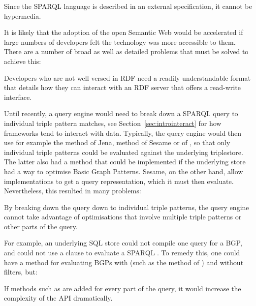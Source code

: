 \begin{problem}\label{prob:tpf}
Since the SPARQL language is described in an external specification,
it cannot be hypermedia.
\end{problem}

It is likely that the adoption of the open Semantic Web would be
accelerated if large numbers of developers felt the technology was
more accessible to them. There are a number of broad as well as
detailed problems that must be solved to achieve this:


\begin{problem}\label{prob:lapis}
Developers who are not well versed in RDF need a readily
understandable format that details how they can interact with an RDF
server that offers a read-write interface.
\end{problem}


Until recently, a query engine would need to break down a SPARQL query
to individual triple pattern matches, see
Section~\ref{sec:introinteract} for how frameworks tend to interact
with data. Typically, the query engine would then use for example
the  method of Jena,  method
of Sesame or  of , so that only
individual triple patterns could be evaluated against the underlying
triplestore.  The latter also had a  method that
could be implemented if the underlying store had a way to optimise
Basic Graph Patterns. Sesame, on the other hand, allow implementations
to get a query representation, which it must then evaluate.
Nevertheless, this resulted in many problems:

\begin{problem}\label{prob:breakdown}
By breaking down the query down to individual triple patterns, the
query engine cannot take advantage of optimisations that involve
multiple triple patterns or other parts of the query.
\end{problem}

For example, an underlying SQL store could not compile one query for a
BGP, and could not use a  clause to evaluate a SPARQL
. To remedy this, one could have a method for
evaluating BGPs with (such as the   method of
) and without filters, but:

\begin{problem}\label{prob:complexapi}
If methods such as  are added for every part of the
query, it would increase the complexity of the API dramatically.
\end{problem}

